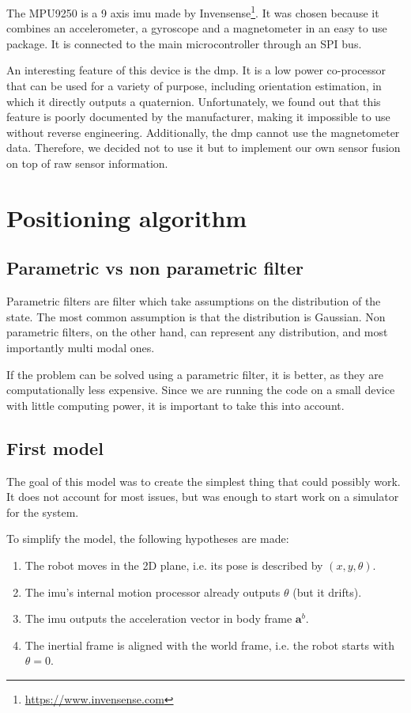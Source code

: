 \documentclass[a4paper]{scrreprt}
\begin{document}
The MPU9250 is a 9 axis \gls{imu} made by Invensense\footnote{\url{https://www.invensense.com}}.
It was chosen because it combines an accelerometer, a gyroscope and a magnetometer in an easy to use package.
It is connected to the main microcontroller through an SPI bus.

An interesting feature of this device is the \gls{dmp}.
It is a low power co-processor that can be used for a variety of purpose, including orientation estimation, in which it directly outputs a quaternion.
Unfortunately, we found out that this feature is poorly documented by the manufacturer, making it impossible to use without reverse engineering.
Additionally, the \gls{dmp} cannot use the magnetometer data.
Therefore, we decided not to use it but to implement our own sensor fusion on top of raw sensor information.

\chapter{Positioning algorithm}

\section{Parametric vs non parametric filter}

Parametric filters are filter which take assumptions on the distribution of the state.
The most common assumption is that the distribution is Gaussian.
Non parametric filters, on the other hand, can represent any distribution, and most importantly multi modal ones.

If the problem can be solved using a parametric filter, it is better, as they are computationally less expensive.
Since we are running the code on a small device with little computing power, it is important to take this into account.


\section{First model}

The goal of this model was to create the simplest thing that could possibly work.
It does not account for most issues, but was enough to start work on a simulator for the system.

To simplify the model, the following hypotheses are made:
\begin{enumerate}
    \item The robot moves in the 2D plane, i.e. its pose is described by $\left( x, y, \theta \right)$.
    \item The \gls{imu}'s internal motion processor already outputs $\theta$ (but it drifts).
    \item The \gls{imu} outputs the acceleration vector in body frame $\mathbf{a}^b$.
    \item The inertial frame is aligned with the world frame, i.e. the robot starts with $\theta=0$.
\end{enumerate}
\end{document}
